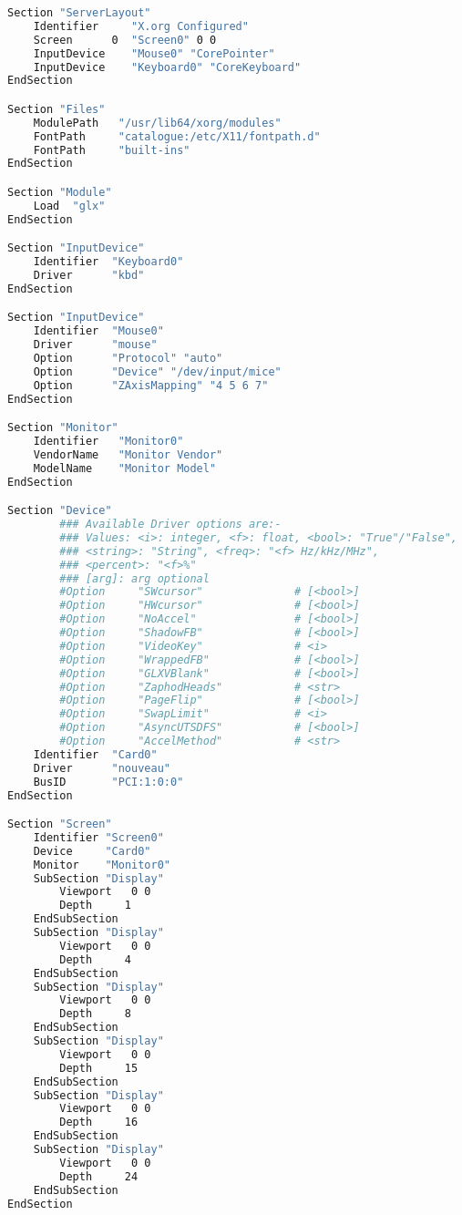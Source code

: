\begin{lstlisting}[language=bash]
Section "ServerLayout"
	Identifier     "X.org Configured"
	Screen      0  "Screen0" 0 0
	InputDevice    "Mouse0" "CorePointer"
	InputDevice    "Keyboard0" "CoreKeyboard"
EndSection

Section "Files"
	ModulePath   "/usr/lib64/xorg/modules"
	FontPath     "catalogue:/etc/X11/fontpath.d"
	FontPath     "built-ins"
EndSection

Section "Module"
	Load  "glx"
EndSection

Section "InputDevice"
	Identifier  "Keyboard0"
	Driver      "kbd"
EndSection

Section "InputDevice"
	Identifier  "Mouse0"
	Driver      "mouse"
	Option	    "Protocol" "auto"
	Option	    "Device" "/dev/input/mice"
	Option	    "ZAxisMapping" "4 5 6 7"
EndSection

Section "Monitor"
	Identifier   "Monitor0"
	VendorName   "Monitor Vendor"
	ModelName    "Monitor Model"
EndSection

Section "Device"
        ### Available Driver options are:-
        ### Values: <i>: integer, <f>: float, <bool>: "True"/"False",
        ### <string>: "String", <freq>: "<f> Hz/kHz/MHz",
        ### <percent>: "<f>%"
        ### [arg]: arg optional
        #Option     "SWcursor"           	# [<bool>]
        #Option     "HWcursor"           	# [<bool>]
        #Option     "NoAccel"            	# [<bool>]
        #Option     "ShadowFB"           	# [<bool>]
        #Option     "VideoKey"           	# <i>
        #Option     "WrappedFB"          	# [<bool>]
        #Option     "GLXVBlank"          	# [<bool>]
        #Option     "ZaphodHeads"        	# <str>
        #Option     "PageFlip"           	# [<bool>]
        #Option     "SwapLimit"          	# <i>
        #Option     "AsyncUTSDFS"        	# [<bool>]
        #Option     "AccelMethod"        	# <str>
	Identifier  "Card0"
	Driver      "nouveau"
	BusID       "PCI:1:0:0"
EndSection

Section "Screen"
	Identifier "Screen0"
	Device     "Card0"
	Monitor    "Monitor0"
	SubSection "Display"
		Viewport   0 0
		Depth     1
	EndSubSection
	SubSection "Display"
		Viewport   0 0
		Depth     4
	EndSubSection
	SubSection "Display"
		Viewport   0 0
		Depth     8
	EndSubSection
	SubSection "Display"
		Viewport   0 0
		Depth     15
	EndSubSection
	SubSection "Display"
		Viewport   0 0
		Depth     16
	EndSubSection
	SubSection "Display"
		Viewport   0 0
		Depth     24
	EndSubSection
EndSection
\end{lstlisting}

